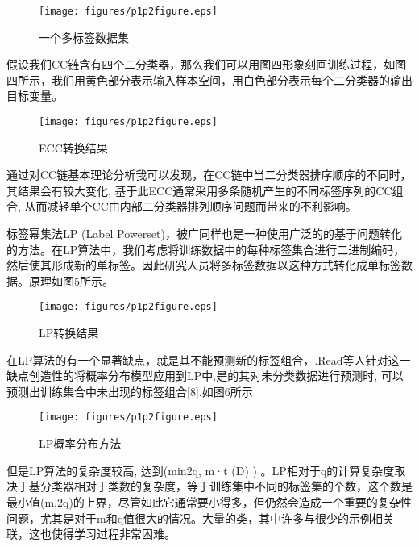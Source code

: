 \begin{figure}[htbp!]
	\centering
	\texttt{[image: figures/p1p2figure.eps]}
	\caption{一个多标签数据集}\label{fig:simuP1P2Result}
	\vspace{-1em}
\end{figure}

假设我们CC链含有四个二分类器，那么我们可以用图四形象刻画训练过程，如图四所示，我们用黄色部分表示输入样本空间，用白色部分表示每个二分类器的输出目标变量。

\begin{figure}[htbp!]
	\centering
	\texttt{[image: figures/p1p2figure.eps]}
	\caption{ECC转换结果}\label{fig:simuP1P2Result}
	\vspace{-1em}
\end{figure}

通过对CC链基本理论分析我可以发现，在CC链中当二分类器排序顺序的不同时，其结果会有较大变化, 基于此ECC通常采用多条随机产生的不同标签序列的CC组合, 从而减轻单个CC由内部二分类器排列顺序问题而带来的不利影响。

标签幂集法LP (Label Powerset)，被广同样也是一种使用广泛的的基于问题转化的方法。在LP算法中，我们考虑将训练数据中的每种标签集合进行二进制编码，然后使其形成新的单标签。因此研究人员将多标签数据以这种方式转化成单标签数据。原理如图5所示。

\begin{figure}[htbp!]
	\centering
	\texttt{[image: figures/p1p2figure.eps]}
	\caption{LP转换结果}\label{fig:simuP1P2Result}
	\vspace{-1em}
\end{figure}

在LP算法的有一个显著缺点，就是其不能预测新的标签组合，.Read等人针对这一缺点创造性的将概率分布模型应用到LP中,是的其对未分类数据进行预测时, 可以预测出训练集合中未出现的标签组合[8].如图6所示

\begin{figure}[htbp!]
	\centering
	\texttt{[image: figures/p1p2figure.eps]}
	\caption{LP概率分布方法}\label{fig:simuP1P2Result}
	\vspace{-1em}
\end{figure}

但是LP算法的复杂度较高, 达到(min{2q, m}·t (D) ) 。LP相对于q的计算复杂度取决于基分类器相对于类数的复杂度，等于训练集中不同的标签集的个数，这个数是最小值(m,2q)的上界，尽管如此它通常要小得多，但仍然会造成一个重要的复杂性问题，尤其是对于m和q值很大的情况。大量的类，其中许多与很少的示例相关联，这也使得学习过程非常困难。

